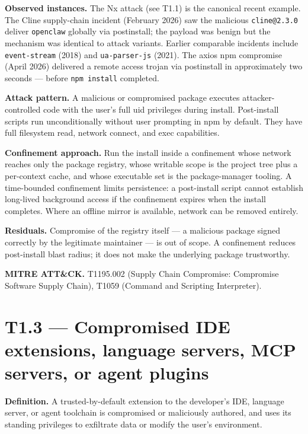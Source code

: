 \textbf{Observed instances.} The Nx attack (see T1.1) is the canonical
recent example. The Cline supply-chain incident (February 2026) saw the
malicious \texttt{cline@2.3.0} deliver \texttt{openclaw} globally via
postinstall; the payload was benign but the mechanism was identical to
attack variants. Earlier comparable incidents include
\texttt{event-stream} (2018) and \texttt{ua-parser-js} (2021). The axios
npm compromise (April 2026) delivered a remote access trojan via
postinstall in approximately two seconds --- before
\texttt{npm\ install} completed.

\textbf{Attack pattern.} A malicious or compromised package executes
attacker-controlled code with the user's full uid privileges during
install. Post-install scripts run unconditionally without user prompting
in npm by default. They have full filesystem read, network connect, and
exec capabilities.

\textbf{Confinement approach.} Run the install inside a confinement
whose network reaches only the package registry, whose writable scope is
the project tree plus a per-context cache, and whose executable set is
the package-manager tooling. A time-bounded confinement limits
persistence: a post-install script cannot establish long-lived
background access if the confinement expires when the install completes.
Where an offline mirror is available, network can be removed entirely.

\textbf{Residuals.} Compromise of the registry itself --- a malicious
package signed correctly by the legitimate maintainer --- is out of
scope. A confinement reduces post-install blast radius; it does not make
the underlying package trustworthy.

\textbf{MITRE ATT\&CK.} T1195.002 (Supply Chain Compromise: Compromise
Software Supply Chain), T1059 (Command and Scripting Interpreter).

\hypertarget{t1.3-compromised-ide-extensions-language-servers-mcp-servers-or-agent-plugins}{%
\section{T1.3 --- Compromised IDE extensions, language servers, MCP
servers, or agent
plugins}\label{t1.3-compromised-ide-extensions-language-servers-mcp-servers-or-agent-plugins}}

\textbf{Definition.} A trusted-by-default extension to the developer's
IDE, language server, or agent toolchain is compromised or maliciously
authored, and uses its standing privileges to exfiltrate data or modify
the user's environment.

